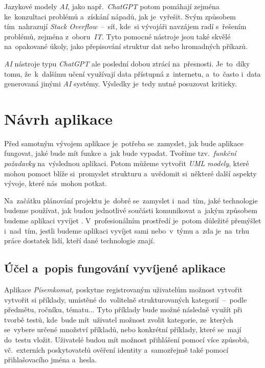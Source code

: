 \documentclass[10pt,a4paper]{article}
\begin{document}
            Jazykové modely \emph{AI}, jako např.~\emph{ChatGPT} potom pomáhají zejména ke~konzultaci problémů a~získání nápadů, jak je~vyřešit. Svým způsobem tím~nahrazují \emph{Stack Overflow}~--~síť, kde~si vývojáři navzájem radí s~řešením problémů, zejména z~oboru~\emph{IT}. Tyto pomocné nástroje jsou také skvělé na~opakované úkoly, jako přepisování struktur dat nebo hromadných příkazů.

            \emph{AI} nástroje typu \emph{ChatGPT} ale poslední dobou ztrácí na~přesnosti. Je~to~díky tomu, že~k~dalšímu učení využívají data přístupná z~internetu, a~to~často i~data generovaná jinými \emph{AI} systémy. Výsledky je~tedy nutné posuzovat kriticky. \cite{computerworld:AI}

	\section{Návrh aplikace}
        Před samotným vývojem aplikace je~potřeba se~zamyslet, jak bude aplikace fungovat, jaké bude mít funkce a~jak bude vypadat. Tvoříme tzv.~\emph{funkční požadavky} na~výslednou aplikaci. Potom můžeme vytvořit \emph{UML modely}, které mohou pomoct blíže si~promyslet strukturu a~uvědomit si~některé další aspekty vývoje, které nás~mohou potkat.

        Na~začátku plánování projektu je~dobré se~zamyslet i~nad~tím, jaké technologie budeme používat, jak budou jednotlivé součásti komunikovat a~jakým způsobem budeme aplikaci vyvíjet \cite{bctynovsky:specifikacepozadavku}. V~profesionálním prostředí je~potom důležité přemýšlet i~nad~tím, jestli budeme aplikaci vyvíjet sami nebo~v~týmu a~zda je~na~trhu práce dostatek lidí, kteří dané technologie znají.

        \subsection{Účel a~popis fungování vyvíjené aplikace}
            Aplikace \emph{Písemkomat}, poskytne registrovaným uživatelům možnost vytvořit vytvořit si příklady, umístěné do~volitelně strukturovaných kategorií~--~podle předmětu, ročníku, tématu... Tyto příklady bude možné následně využít při tvorbě testů, kde~bude mít~uživatel možnost zvolit kategorie, ze~kterých se~vybere určené množství příkladů, nebo konkrétní příklady, které se~mají do~testu vložit. Uživatelé budou mít možnost přihlášení pomocí více způsobů, vč.~externích poskytovatelů ověření identity a~samozřejmě také pomocí přihlašovacího jména a~hesla.
            
\end{document}
